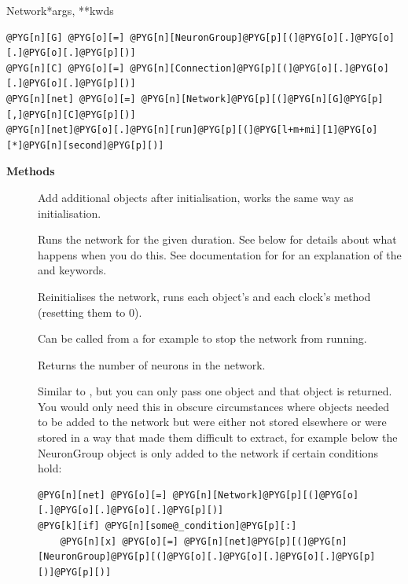 \documentclass[letterpaper,10pt,english]{manual}
\begin{document}
\begin{classdesc}{Network}{*args, **kwds}
\begin{Verbatim}[commandchars=@\[\]]
@PYG[n][G] @PYG[o][=] @PYG[n][NeuronGroup]@PYG[p][(]@PYG[o][.]@PYG[o][.]@PYG[o][.]@PYG[p][)]
@PYG[n][C] @PYG[o][=] @PYG[n][Connection]@PYG[p][(]@PYG[o][.]@PYG[o][.]@PYG[o][.]@PYG[p][)]
@PYG[n][net] @PYG[o][=] @PYG[n][Network]@PYG[p][(]@PYG[n][G]@PYG[p][,]@PYG[n][C]@PYG[p][)]
@PYG[n][net]@PYG[o][.]@PYG[n][run]@PYG[p][(]@PYG[l+m+mi][1]@PYG[o][*]@PYG[n][second]@PYG[p][)]
\end{Verbatim}

\textbf{Methods}
\begin{description}
\item[] \leavevmode
Add additional objects after initialisation, works the same way
as initialisation.

\item[] \leavevmode
Runs the network for the given duration. See below for details about
what happens when you do this. See documentation for \hyperlink{brian.run}{} for
an explanation of the  and  keywords.

\item[] \leavevmode
Reinitialises the network, runs each object's  and each
clock's  method (resetting them to 0).

\item[] \leavevmode
Can be called from a \hyperlink{brian.network_operation}{} for example to stop the
network from running.

\item[] \leavevmode
Returns the number of neurons in the network.

\item[] \leavevmode
Similar to , but you can only pass one object and that
object is returned. You would only need this in obscure
circumstances where objects needed to be added to the network
but were either not stored elsewhere or were stored in a way
that made them difficult to extract, for example below the
NeuronGroup object is only added to the network if certain
conditions hold:

\begin{Verbatim}[commandchars=@\[\]]
@PYG[n][net] @PYG[o][=] @PYG[n][Network]@PYG[p][(]@PYG[o][.]@PYG[o][.]@PYG[o][.]@PYG[p][)]
@PYG[k][if] @PYG[n][some@_condition]@PYG[p][:]
    @PYG[n][x] @PYG[o][=] @PYG[n][net]@PYG[p][(]@PYG[n][NeuronGroup]@PYG[p][(]@PYG[o][.]@PYG[o][.]@PYG[o][.]@PYG[p][)]@PYG[p][)]
\end{Verbatim}


\end{description}
\end{classdesc}
\end{document}
